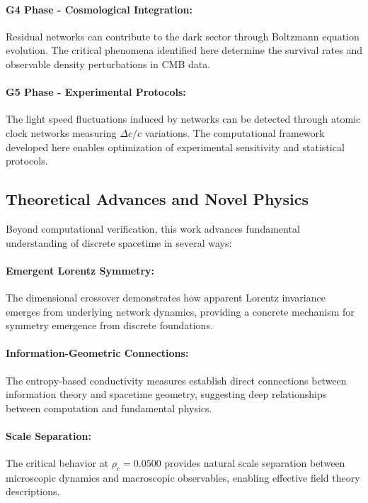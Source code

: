 \paragraph{G4 Phase - Cosmological Integration:}
Residual \saturon{} networks can contribute to the dark sector through 
Boltzmann equation evolution. The critical phenomena identified here determine 
the survival rates and observable density perturbations in CMB data.

\paragraph{G5 Phase - Experimental Protocols:}
The light speed fluctuations induced by \saturon{} networks can be detected 
through atomic clock networks measuring $\Delta c/c$ variations. The computational 
framework developed here enables optimization of experimental sensitivity and 
statistical protocols.

\subsection{Theoretical Advances and Novel Physics}

Beyond computational verification, this work advances fundamental understanding 
of discrete spacetime in several ways:

\paragraph{Emergent Lorentz Symmetry:}
The dimensional crossover demonstrates how apparent Lorentz invariance emerges 
from underlying \saturon{} network dynamics, providing a concrete mechanism 
for symmetry emergence from discrete foundations.

\paragraph{Information-Geometric Connections:}
The entropy-based conductivity measures establish direct connections between 
information theory and spacetime geometry, suggesting deep relationships 
between computation and fundamental physics.

\paragraph{Scale Separation:}
The critical behavior at $\rho_c = 0.0500$ provides natural scale separation 
between microscopic \saturon{} dynamics and macroscopic observables, enabling 
effective field theory descriptions.

